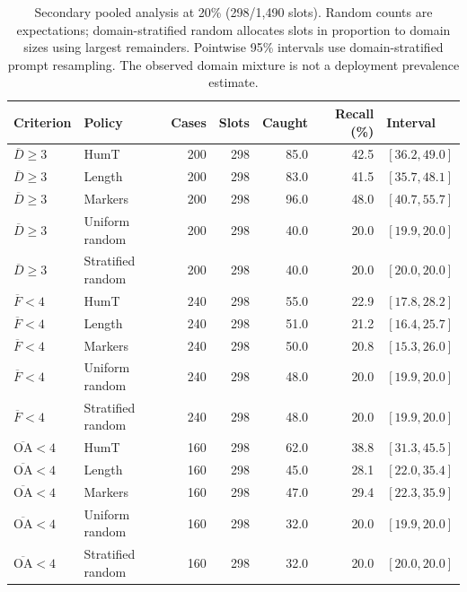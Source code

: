 \begin{table}[p]
\centering\footnotesize
\caption{Secondary pooled analysis at 20\% (298/1,490 slots). Random counts are expectations; domain-stratified random allocates slots in proportion to domain sizes using largest remainders. Pointwise 95\% intervals use domain-stratified prompt resampling. The observed domain mixture is not a deployment prevalence estimate.}
\label{tab:pooled}
\begin{tabular}{llrrrrl}
\toprule
Criterion & Policy & Cases & Slots & Caught & Recall (\%) & Interval \\
\midrule
$\overline D\geq3$ & HumT & 200 & 298 & 85.0 & 42.5 & $[36.2, 49.0]$ \\
$\overline D\geq3$ & Length & 200 & 298 & 83.0 & 41.5 & $[35.7, 48.1]$ \\
$\overline D\geq3$ & Markers & 200 & 298 & 96.0 & 48.0 & $[40.7, 55.7]$ \\
$\overline D\geq3$ & Uniform random & 200 & 298 & 40.0 & 20.0 & $[19.9, 20.0]$ \\
$\overline D\geq3$ & Stratified random & 200 & 298 & 40.0 & 20.0 & $[20.0, 20.0]$ \\
$\overline F<4$ & HumT & 240 & 298 & 55.0 & 22.9 & $[17.8, 28.2]$ \\
$\overline F<4$ & Length & 240 & 298 & 51.0 & 21.2 & $[16.4, 25.7]$ \\
$\overline F<4$ & Markers & 240 & 298 & 50.0 & 20.8 & $[15.3, 26.0]$ \\
$\overline F<4$ & Uniform random & 240 & 298 & 48.0 & 20.0 & $[19.9, 20.0]$ \\
$\overline F<4$ & Stratified random & 240 & 298 & 48.0 & 20.0 & $[19.9, 20.0]$ \\
$\overline{\mathrm{OA}}<4$ & HumT & 160 & 298 & 62.0 & 38.8 & $[31.3, 45.5]$ \\
$\overline{\mathrm{OA}}<4$ & Length & 160 & 298 & 45.0 & 28.1 & $[22.0, 35.4]$ \\
$\overline{\mathrm{OA}}<4$ & Markers & 160 & 298 & 47.0 & 29.4 & $[22.3, 35.9]$ \\
$\overline{\mathrm{OA}}<4$ & Uniform random & 160 & 298 & 32.0 & 20.0 & $[19.9, 20.0]$ \\
$\overline{\mathrm{OA}}<4$ & Stratified random & 160 & 298 & 32.0 & 20.0 & $[20.0, 20.0]$ \\
\bottomrule
\end{tabular}
\end{table}
